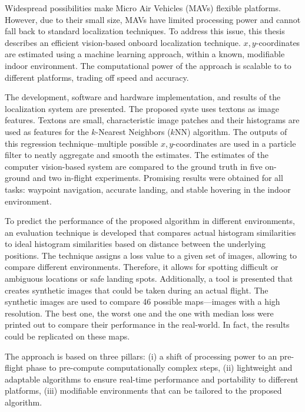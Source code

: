 Widespread possibilities make Micro Air Vehicles (MAVs) flexible platforms.
However, due to their small size, MAVs have limited processing power and cannot
fall back to standard localization techniques. To address this
issue, this thesis describes an efficient vision-based onboard localization
technique. $x,y$-coordinates are estimated using a machine
learning approach, within a known, modifiable indoor
environment. The computational power of the approach is scalable to to different platforms, trading off speed and accuracy.

The development, software and hardware
implementation, and results of the localization system are presented. The proposed syste uses 
textons as image features. Textons are small, characteristic image patches and their histograms are used as features for the $k$-Nearest Neighbors ($k$NN)
algorithm. The outputs of this regression technique--multiple possible
$x, y$-coordinates are used in a particle filter to neatly aggregate
and smooth the estimates. The estimates of the computer vision-based
system are compared to the ground truth in five on-ground and two
in-flight experiments. Promising results were obtained for all tasks:
waypoint navigation, accurate landing, and stable hovering in the
indoor environment.

To predict the performance of the proposed algorithm in different environments, an evaluation
technique is developed that compares actual histogram similarities to
ideal histogram similarities based on distance between the underlying
positions. The technique assigns a loss value to a given set of
images, allowing to compare different environments. Therefore, it
allows for spotting difficult or ambiguous locations or safe landing
spots. Additionally, a tool is presented that creates synthetic images
that could be taken during an actual flight. The synthetic images are
used to compare 46 possible maps---images with a high resolution. The
best one, the worst one and the one with median loss were printed out
to compare their performance in the real-world. In fact, the results
could be replicated on these maps.

The approach is based on three pillars: (i) a shift of processing power to an pre-flight phase to pre-compute
computationally complex steps, (ii) lightweight and adaptable algorithms to ensure real-time performance and portability to different platforms,
(iii) modifiable environments that can be tailored to the proposed algorithm. 